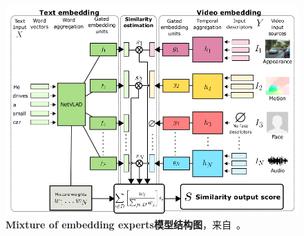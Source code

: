 \begin{figure}[tbh!]
    \centering
    \includegraphics[width=\linewidth]{figures/related_miech2018}
    \caption[Miech等人~\cite{miech2018learning}的Mixture of embedding experts模型结构图]{\textbf{Mixture of embedding experts模型结构图}，来自~\cite{miech2018learning}。}
    \label{fig:related_miech2018}
\end{figure}

